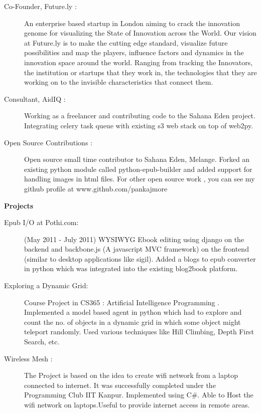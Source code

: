 \documentclass[letterpaper,11pt]{article}
\newcommand{\resheading}[1]{{\large \colorbox{mygrey}{\begin{minipage}{\textwidth}{\textbf{#1 \vphantom{p\^{E}}}}\end{minipage}}}}
\begin{document}
\begin{description}
\item[Co-Founder, Future.ly : ] An enterprise based startup in London aiming to crack the innovation genome for visualizing the State of Innovation across the World. Our vision at Future.ly is to make the cutting edge standard, visualize future possibilities and map the players, influence factors and dynamics in the innovation space around the world. Ranging from tracking the Innovators, the institution or startups that they work in, the technologies that they are working on to the invisible characteristics that connect them. 
\item[Consultant, AidIQ : ] Working as a freelancer and contributing code to the Sahana Eden project. Integrating celery task queue with existing s3 web stack on top of web2py.
\item[Open Source Contributions : ] Open source small time contributor to Sahana Eden, Melange. Forked an existing python module called python-epub-builder and added support for handling images in html files. For other open source work , you can see my github profile at www.github.com/pankajmore
\end{description}

\resheading{Projects}

\begin{description}
\item[Epub I/O at Pothi.com: ] (May 2011 - July 2011) WYSIWYG Ebook editing using django on the backend and backbone.js (A javascript MVC framework) on the frontend (similar to desktop applications like sigil). Added a blogs to epub converter in python which was integrated into the existing blog2book platform.

\item[Exploring a Dynamic Grid:] Course Project in CS365 : Artificial Intelligence Programming . Implemented a model based agent in python which had to explore and count the no. of objects in a dynamic grid in which some object might teleport randomly. Used various techniques like Hill Climbing, Depth First Search, etc.

\item[Wireless Mesh : ] The Project is based on the idea to create wifi network from a laptop connected to internet. It was successfully completed under the Programming Club IIT Kanpur. Implemented using C\#. Able to Host the wifi network on laptops.Useful to provide internet access in remote areas.\\


\end{description}
\end{document}
